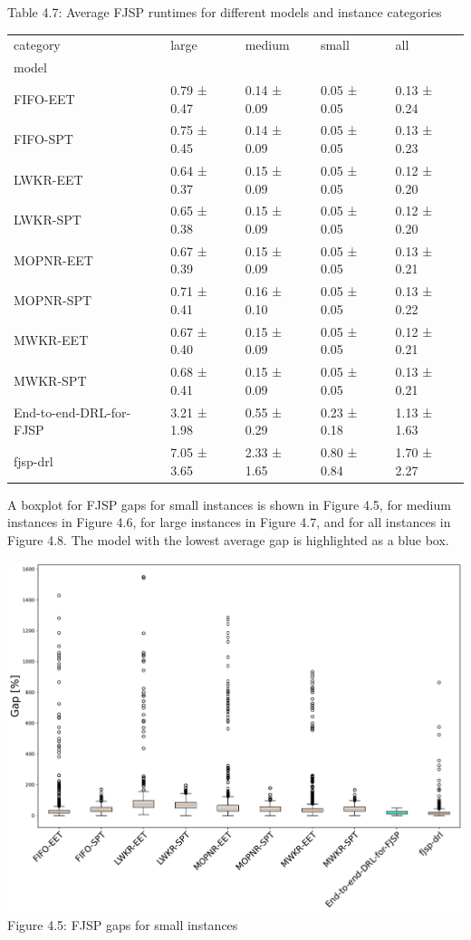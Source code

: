 \begin{table}
    Table 4.7: Average FJSP runtimes for different models and instance categories\\
    \vspace{1mm}
    \label{table:4.5}
    \footnotesize 
    \begin{tabular}{lllll}
        \toprule
        category & large & medium & small & all \\
        model &  &  &  &  \\
        \midrule
        FIFO-EET & 0.79 ± 0.47 & 0.14 ± 0.09 & 0.05 ± 0.05 & 0.13 ± 0.24 \\
        FIFO-SPT & 0.75 ± 0.45 & 0.14 ± 0.09 & 0.05 ± 0.05 & 0.13 ± 0.23 \\
        LWKR-EET & 0.64 ± 0.37 & 0.15 ± 0.09 & 0.05 ± 0.05 & 0.12 ± 0.20 \\
        LWKR-SPT & 0.65 ± 0.38 & 0.15 ± 0.09 & 0.05 ± 0.05 & 0.12 ± 0.20 \\
        MOPNR-EET & 0.67 ± 0.39 & 0.15 ± 0.09 & 0.05 ± 0.05 & 0.13 ± 0.21 \\
        MOPNR-SPT & 0.71 ± 0.41 & 0.16 ± 0.10 & 0.05 ± 0.05 & 0.13 ± 0.22 \\
        MWKR-EET & 0.67 ± 0.40 & 0.15 ± 0.09 & 0.05 ± 0.05 & 0.12 ± 0.21 \\
        MWKR-SPT & 0.68 ± 0.41 & 0.15 ± 0.09 & 0.05 ± 0.05 & 0.13 ± 0.21 \\
        End-to-end-DRL-for-FJSP & 3.21 ± 1.98 & 0.55 ± 0.29 & 0.23 ± 0.18 & 1.13 ± 1.63 \\
        fjsp-drl & 7.05 ± 3.65 & 2.33 ± 1.65 & 0.80 ± 0.84 & 1.70 ± 2.27 \\
        \bottomrule
    \end{tabular}
\end{table}


A boxplot for FJSP gaps for small instances is shown in Figure 4.5, for medium instances in Figure 4.6, for large instances in Figure 4.7, and for all instances in Figure 4.8. The model with the lowest average gap is highlighted as a blue box.

\begin{center}
    \includegraphics[width=0.8\linewidth]{images/horizontal_boxplot_fjsp_small.pdf}\\
    Figure 4.5: FJSP gaps for small instances
\end{center}

